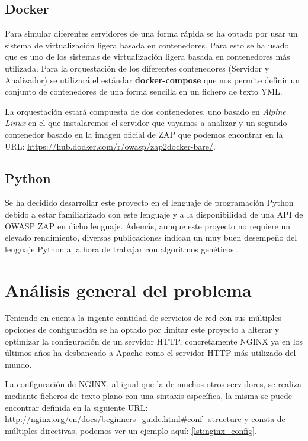 \subsection{Docker}

Para simular diferentes servidores de una forma rápida se ha optado por usar un sistema de virtualización ligera basada en contenedores. Para esto se ha usado  que es uno de los sistemas de virtualización ligera basada en contenedores más utilizada. Para la orquestación de los diferentes contenedores (Servidor y Analizador) se utilizará el estándar \textbf{docker-compose} que nos permite definir un conjunto de contenedores de una forma sencilla en un fichero de texto YML.

\bigskip
La orquestación estará compuesta de dos contenedores, uno basado en \textit{Alpine Linux} en el que instalaremos el servidor que vayamos a analizar y un segundo contenedor basado en la imagen oficial de ZAP que podemos encontrar en la URL: \url{https://hub.docker.com/r/owasp/zap2docker-bare/}.

\subsection{Python}

Se ha decidido desarrollar este proyecto en el lenguaje de programación Python debido a estar familiarizado con este lenguaje y a la disponibilidad de una API de OWASP ZAP en dicho lenguaje. Además, aunque este proyecto no requiere un elevado rendimiento, diversas publicaciones indican un muy buen desempeño del lenguaje Python a la hora de trabajar con algoritmos genéticos \cite{merelo-guervos_comparison_2016}.

\section{Análisis general del problema}

Teniendo en cuenta la ingente cantidad de servicios de red con sus múltiples opciones de configuración se ha optado por limitar este proyecto a alterar y optimizar la configuración de un servidor HTTP, concretamente NGINX ya en los últimos años ha desbancado a Apache como el servidor HTTP  más utilizado del mundo\cite{w3techs_usage_2019}.

\bigskip
La configuración de NGINX, al igual que la de muchos otros servidores, se realiza mediante ficheros de texto plano con una sintaxis específica, la misma se puede encontrar definida en la siguiente URL: \url{http://nginx.org/en/docs/beginners_guide.html#conf_structure} y consta de múltiples directivas, podemos ver un ejemplo aquí: \ref{lst:nginx_config}.


